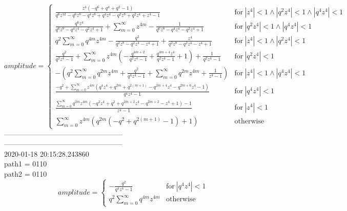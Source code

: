 \documentclass{jsreport}
\begin{document}
$$amplitude = \begin{cases} \frac{z^{4} \left(- q^{6} + q^{4} + q^{2} - 1\right)}{q^{6} z^{12} - q^{6} z^{8} - q^{4} z^{8} + q^{4} z^{4} - q^{2} z^{8} + q^{2} z^{4} + z^{4} - 1} & \text{for}\: \left|{z^{4}}\right| < 1 \wedge \left|{q^{2} z^{4}}\right| < 1 \wedge \left|{q^{4} z^{4}}\right| < 1 \\\frac{q^{6} z^{4}}{q^{6} z^{8} - q^{4} z^{4} - q^{2} z^{4} + 1} + \sum_{m=0}^{\infty} z^{4 m} - \frac{1}{q^{6} z^{8} - q^{4} z^{4} - q^{2} z^{4} + 1} & \text{for}\: \left|{q^{2} z^{4}}\right| < 1 \wedge \left|{q^{4} z^{4}}\right| < 1 \\q^{2} \sum_{m=0}^{\infty} q^{4 m} z^{4 m} - \frac{q^{2}}{q^{2} z^{8} - q^{2} z^{4} - z^{4} + 1} + \frac{z^{4}}{q^{2} z^{8} - q^{2} z^{4} - z^{4} + 1} & \text{for}\: \left|{z^{4}}\right| < 1 \wedge \left|{q^{2} z^{4}}\right| < 1 \\\frac{q^{2}}{q^{2} z^{4} - 1} + \sum_{m=0}^{\infty} z^{4 m} \left(- \frac{q^{4 m + 2}}{q^{2} z^{4} - 1} + \frac{q^{4 m + 4} z^{4}}{q^{2} z^{4} - 1} + 1\right) + \frac{1}{q^{2} z^{4} - 1} & \text{for}\: \left|{q^{2} z^{4}}\right| < 1 \\- (q^{2} \sum_{m=0}^{\infty} q^{2 m} z^{4 m} + \frac{q^{2}}{q^{4} z^{4} - 1} + \sum_{m=0}^{\infty} q^{2 m} z^{4 m} + \frac{1}{z^{4} - 1}) & \text{for}\: \left|{z^{4}}\right| < 1 \wedge \left|{q^{4} z^{4}}\right| < 1 \\\frac{- q^{2} + \sum_{m=0}^{\infty} z^{4 m} \left(q^{4} z^{4} + q^{2 m} + q^{2 \left(m + 1\right)} - q^{2 m + 4} z^{4} - q^{2 m + 6} z^{4} - 1\right)}{q^{4} z^{4} - 1} & \text{for}\: \left|{q^{4} z^{4}}\right| < 1 \\\frac{\sum_{m=0}^{\infty} q^{2 m} z^{4 m} \left(- q^{2} z^{4} + q^{2} + q^{2 m + 2} z^{4} - q^{2 m + 2} - z^{4} + 1\right) - 1}{z^{4} - 1} & \text{for}\: \left|{z^{4}}\right| < 1 \\\sum_{m=0}^{\infty} z^{4 m} \left(q^{2 m} \left(- q^{2} + q^{2 \left(m + 1\right)} - 1\right) + 1\right) & \text{otherwise} \end{cases}$$
--------------------------------------------------\\
--------------------------------------------------\\
2020-01-18 20:15:28.243860\\
path1 = 0110\\
path2 = 0110\\
$$amplitude = \begin{cases} - \frac{q^{2}}{q^{4} z^{4} - 1} & \text{for}\: \left|{q^{4} z^{4}}\right| < 1 \\q^{2} \sum_{m=0}^{\infty} q^{4 m} z^{4 m} & \text{otherwise} \end{cases}$$
\end{document}
